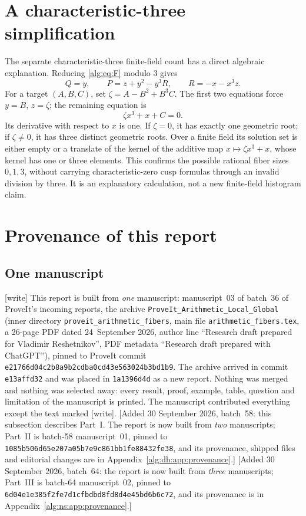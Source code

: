 \documentclass[11pt]{article}
\numberwithin{equation}{section}
\theoremstyle{plain}
\theoremstyle{plain}
\theoremstyle{plain}
\theoremstyle{definition}
\theoremstyle{definition}
\theoremstyle{definition}
\theoremstyle{remark}
\newcommand{\wtag}{\textup{[write]}}%
\newcommand{\dhsha}{\nolinkurl{1085b506d65e207a05b7e9c861bb1fe88432fe38}}
\newcommand{\nssha}{\nolinkurl{6d04e1e385f2fe7d1cfbdbd8fd8d4e45bd6b6c72}}
\begin{document}
\section{A characteristic-three simplification}
The separate characteristic-three finite-field count has a direct
algebraic explanation. Reducing \eqref{alg:eq:F} modulo $3$ gives
\[
 Q=y,\qquad P=z+y^2-y^3R,\qquad R=-x-x^3z.
\]
For a target $(A,B,C)$, set
$\zeta=A-B^2+B^3C$. The first two equations force $y=B$, $z=\zeta$;
the remaining equation is
\[
 \zeta x^3+x+C=0.
\]
Its derivative with respect to $x$ is one. If $\zeta=0$, it has exactly
one geometric root; if $\zeta\ne0$, it has three distinct geometric roots.
Over a finite field its solution set is either empty or a translate of
the kernel of the additive map $x\mapsto\zeta x^3+x$, whose kernel
has one or three elements. This confirms the possible rational fiber
sizes $0,1,3$, without carrying characteristic-zero cusp formulas
through an invalid division by three. It is an explanatory calculation,
not a new finite-field histogram claim.

\section{Provenance of this report}\label{alg:app:report}

\subsection{One manuscript}\label{alg:app:onesource}
\wtag{} This report is built from \emph{one} manuscript: manuscript~03 of
batch~36 of ProveIt's incoming reports, the archive
\texttt{ProveIt\_Arithmetic\_Local\_Global} (inner directory
\texttt{proveit\_arithmetic\_fibers}, main file
\texttt{arithmetic\_fibers.tex}, a 26-page PDF dated 24~September 2026,
author line ``Research draft prepared for Vladimir Reshetnikov'', PDF
metadata ``Research draft prepared with ChatGPT''), pinned to ProveIt
commit \nolinkurl{e21766d04c2b8a9b2cdba0cd43e563024b3bd1b9}. The archive
arrived in commit \texttt{e13affd32} and was placed in \texttt{1a1396d4d}
as a new report. Nothing was merged and nothing was selected away: every
result, proof, example, table, question and limitation of the manuscript
is printed. The manuscript contributed everything except the text marked
\wtag.
[Added 30 September 2026, batch~58: this subsection describes Part~I. The
report is now built from \emph{two} manuscripts; Part~II is batch-58
manuscript~01, pinned to \dhsha, and its provenance, shipped files and
editorial changes are in Appendix~\ref{alg:dh:app:provenance}.]
[Added 30 September 2026, batch~64: the report is now built from
\emph{three} manuscripts; Part~III is batch-64 manuscript~02, pinned to
\nssha, and its provenance is in Appendix~\ref{alg:ns:app:provenance}.]
\end{document}
